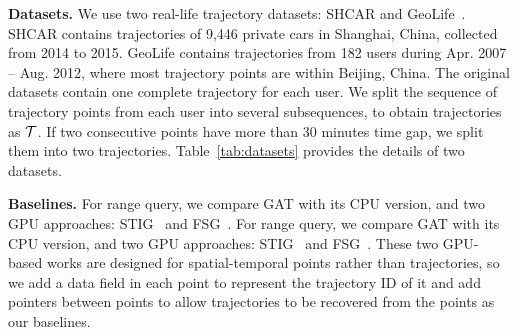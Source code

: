 \documentclass[10pt,conference,letterpaper]{IEEEtran}
\newcommand{\frname}{GAT\xspace }
\newcommand{\alltraj}{{{\cal T}}\xspace}
\begin{document}
\vspace{0.1cm}\textbf{Datasets.}
We use two real-life trajectory datasets: SHCAR and  GeoLife~\cite{DBLP:journals/debu/ZhengXM10}.
SHCAR contains trajectories of 9,446 private cars in Shanghai, China, collected from 2014 to 2015. GeoLife contains trajectories from 182 users during Apr. 2007 -- Aug. 2012, where most trajectory points are within Beijing, China.
%
The original datasets contain one complete trajectory for each user.
We split the sequence of trajectory points from each user into several subsequences, to obtain trajectories as $\alltraj$. If two consecutive points have more than 30 minutes time gap, we split them into two trajectories.
Table~\ref{tab:datasets} provides the details of two datasets.



\vspace{0.1cm}\textbf{Baselines.}
For range query, we compare \frname with its CPU version, and two GPU approaches: STIG~\cite{7498315} and FSG~\cite{GPUTaxi}.
For range query, we compare \frname with its CPU version, and two GPU approaches: STIG~\cite{7498315} and FSG~\cite{GPUTaxi}. These two GPU-based works are designed for spatial-temporal points rather than trajectories, so we add a data field in each point to represent the trajectory ID of it and add pointers between points to allow trajectories to be recovered from the points as our baselines.
\end{document}
